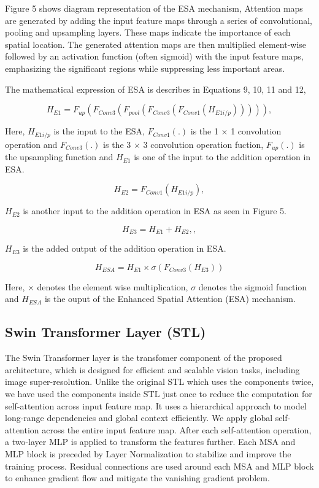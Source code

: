 \documentclass{ieeeaccess}
\begin{document}
Figure 5 shows diagram representation of the ESA mechanism, Attention maps are generated by adding the input feature maps through a series of convolutional, pooling and upsampling layers. These maps indicate the importance of each spatial location. The generated attention maps are then multiplied element-wise followed by an activation function (often sigmoid) with the input feature maps, emphasizing the significant regions while suppressing less important areas.

The mathematical expression of ESA is describes in Equations 9, 10, 11 and 12,

\begin{equation}
{H_{E1}}= {F_{up}}({F_{Conv3}}({F_{pool}}({F_{Conv3}}({F_{Conv1}}({H_{E1{i/p}}}))))),
\end{equation}

Here, ${H_{E1{i/p}}}$ is the input to the ESA, ${F_{Conv1}}$$(.)$ is the 1 $\times$ 1 convolution operation and ${F_{Conv3}}$$(.)$ is the 3 $\times$ 3 convolution operation fuction, ${F_{up}}$$(.)$ is the upsampling function and ${H_{E1}}$ is one of the input to the addition operation in ESA.
 
\begin{equation}
{H_{E2}}= {F_{Conv1}}({H_{E1{i/p}}}),
\end{equation}

${H_{E2}}$ is another input to the addition operation in ESA as seen in Figure 5.

\begin{equation}
{H_{E3}}= {H_{E1}} + {H_{E2}},,
\end{equation}

${H_{E3}}$ is the added output of the addition operation in ESA.

\begin{equation}
{H_{ESA}} = H_{E1} \times \sigma \left( F_{Conv3} \left( H_{E3} \right) \right)
\end{equation}

Here, $\times$ denotes the element wise multiplication, $\sigma$ denotes the sigmoid function and ${H_{ESA}}$ is the ouput of the Enhanced Spatial Attention (ESA) mechanism.


\subsection{Swin Transformer Layer (STL)}

The Swin Transformer layer is the transfomer component of the proposed architecture, which is designed for efficient and scalable vision tasks, including image super-resolution. Unlike the original STL which uses the components twice, we have used the components inside STL just once to reduce the computation  for self-attention across input feature map. It uses a hierarchical approach to model long-range dependencies and global context efficiently. We apply global self-attention across the entire input feature map. After each self-attention operation, a two-layer MLP is applied to transform the features further. Each MSA and MLP block is preceded by Layer Normalization to stabilize and improve the training process. Residual connections are used around each MSA and MLP block to enhance gradient flow and mitigate the vanishing gradient problem.
\end{document}
